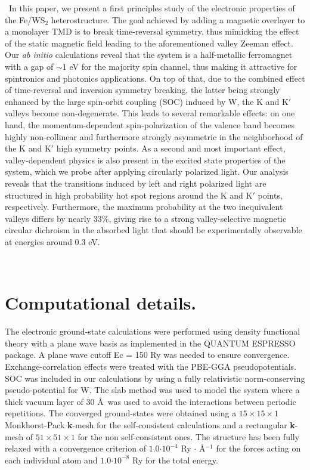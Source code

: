 \documentclass[aps,prb,showpacs,preprintnumbers,twocolumn,amsmath,amssymb]{revtex4-1}
\begin{document}
\
In this paper, we present a first principles study of the electronic 
properties of the Fe/WS$_2$ heterostructure. 
The goal achieved by adding a magnetic overlayer to a monolayer TMD is to break
time-reversal symmetry, thus mimicking the effect of the static magnetic field
leading to the aforementioned valley Zeeman effect.
Our \textit{ab initio} calculations
reveal that the system is a half-metallic ferromagnet with a gap of $\sim 1$ eV for the majority spin channel, 
thus making it attractive for spintronics and photonics applications. 
On top of that, due to the combined effect of time-reversal and inversion symmetry breaking,
the latter being strongly enhanced by the large spin-orbit coupling (SOC) induced by W,
the K and K$'$ valleys become non-degenerate.
This leads to several remarkable effects: on one hand, the momentum-dependent
spin-polarization of the valence band becomes highly non-collinear and furthermore
strongly asymmetric in the neighborhood of the K and K$'$ high symmetry points. 
As a second and most important effect, valley-dependent physics is also present in the excited state properties of the system, which we probe after applying circularly polarized light.
Our analysis reveals that the transitions induced by left and right polarized light
are structured in high probability hot spot regions around the K and K$'$ points, respectively.
Furthermore, the maximum probability at the two inequivalent valleys differs by nearly $33\%$,
giving rise to a strong valley-selective magnetic circular 
dichroism in the absorbed light that should be experimentally observable 
at energies around $0.3$ eV.


\

\section{Computational details.} The electronic ground-state calculations were performed using density functional theory with a plane wave basis as implemented in the QUANTUM ESPRESSO\cite{QE} package. A plane wave cutoff Ec = 150 Ry was needed to ensure convergence. Exchange-correlation effects were treated with the PBE-GGA\cite{Perdew1996} pseudopotentials. SOC was included in our calculations by using a fully relativistic norm-conserving pseudo-potential \cite{DalCorso2005} for W. The slab method was used to model the system where a thick vacuum layer of 30 \AA\ was used to avoid the interactions between periodic repetitions. The converged ground-states were obtained using a $15\times15\times1$ Monkhorst-Pack\cite{Pack1977} \textbf{k}-mesh for the self-consistent calculations and a rectangular \textbf{k}-mesh of $51\times51\times1$ for the non self-consistent ones. The structure has been fully relaxed with a convergence criterion of $1.0 \boldsymbol{\cdot} 10^{-4}$ Ry $\boldsymbol{\cdot}$ \AA$^{-1}$ for the forces acting on each individual atom and $1.0 \boldsymbol{\cdot} 10^{-8}$ Ry for the total energy.
\end{document}
